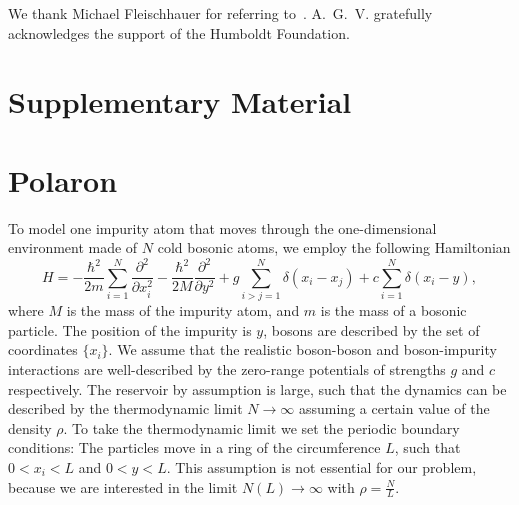 \documentclass[twocolumn,amsmath,amssymb,showpacs,prl,superscriptaddress,aps]{revtex4-1}
\begin{document}
\begin{acknowledgments}
We thank Michael Fleischhauer for referring to~\cite{paper}.
A.~G.~V. gratefully acknowledges the support of the Humboldt Foundation.
\end{acknowledgments}

\widetext

\section{Supplementary Material}

\section{Polaron}

To model one impurity atom that moves through the one-dimensional environment made of $N$ cold bosonic atoms, we employ the following Hamiltonian
\begin{equation}
H=-\frac{\hbar^2}{2m}\sum_{i=1}^N\frac{\partial^2}{\partial x_i^2}-\frac{\hbar^2}{2M}\frac{\partial^2}{\partial y^2}+g\sum_{i>j=1}^N\delta(x_i-x_j)+c\sum_{i=1}^N \delta(x_i-y),
\end{equation}
where $M$ is the mass of the impurity atom, and $m$ is the mass of a bosonic particle. The position of the impurity is $y$, bosons are described by the set of coordinates $\{x_i\}$. 
We assume that the realistic boson-boson and boson-impurity interactions are well-described by the zero-range potentials of strengths $g$ and $c$ respectively. 
The reservoir by assumption is large, such that the dynamics can be described by the thermodynamic limit $N\to \infty$ assuming a certain value of the density $\rho$.
To take the thermodynamic limit we set the periodic boundary conditions: The particles move in a ring of the circumference $L$, such that $0<x_i<L$ and $0<y<L$.
This assumption is not essential for our problem, because we are interested in the limit $N(L)\to \infty$ with $\rho=\frac{N}{L}$.
\end{document}
